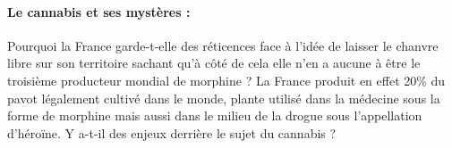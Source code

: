 \paragraph{Le cannabis et ses mystères :}

Pourquoi la France garde-t-elle des réticences face à l’idée de laisser le chanvre libre sur son territoire sachant qu’à côté de cela elle n’en a aucune à être le troisième producteur mondial de morphine ? La France produit en effet 20\% du pavot légalement cultivé dans le monde, plante utilisé dans la médecine sous la forme de morphine mais aussi dans le milieu de la drogue sous l’appellation d’héroïne. Y a-t-il des enjeux derrière le sujet du cannabis ? 
